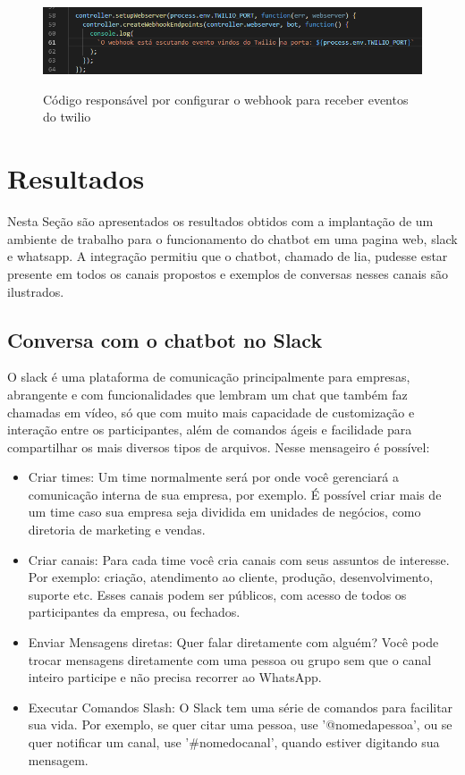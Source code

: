 \begin{figure}[H]
  \centering
   \caption{Código responsável por configurar o webhook para receber eventos do twilio}
  \includegraphics[scale=0.5]{Imagens/twilio-webhook-code.PNG} 
  \label{twilio-webhook-code}
\end{figure}






\chapter{Resultados }

Nesta Seção são apresentados os resultados obtidos com a implantação de um ambiente de trabalho para o funcionamento do chatbot em uma pagina web, slack e whatsapp. A integração permitiu que o chatbot, chamado de lia, pudesse estar presente em todos os canais propostos e exemplos de conversas nesses canais são ilustrados.

\section{Conversa com o chatbot no Slack}

O slack é uma plataforma de comunicação principalmente para empresas, abrangente e com funcionalidades que lembram um chat que também faz chamadas em vídeo, só que com muito mais capacidade de customização e interação entre os participantes, além de comandos ágeis e facilidade para compartilhar os mais diversos tipos de arquivos. Nesse mensageiro é possível:


\begin{itemize}
    \item Criar times: Um time normalmente será por onde você gerenciará a comunicação interna de sua empresa, por exemplo. É possível criar mais de um time caso sua empresa seja dividida em unidades de negócios, como diretoria de marketing e vendas.

    \item Criar canais: Para cada time você cria canais com seus assuntos de interesse. Por exemplo: criação, atendimento ao cliente, produção, desenvolvimento, suporte etc. Esses canais podem ser públicos, com acesso de todos os participantes da empresa, ou fechados.

    \item Enviar Mensagens diretas: Quer falar diretamente com alguém? Você pode trocar mensagens diretamente com uma pessoa ou grupo sem que o canal inteiro participe e não precisa recorrer ao WhatsApp.

    \item Executar Comandos Slash: O Slack tem uma série de comandos para facilitar sua vida. Por exemplo, se quer citar uma pessoa, use '@nomedapessoa', ou se quer notificar um canal, use '#nomedocanal', quando estiver digitando sua mensagem.
\end{itemize}

